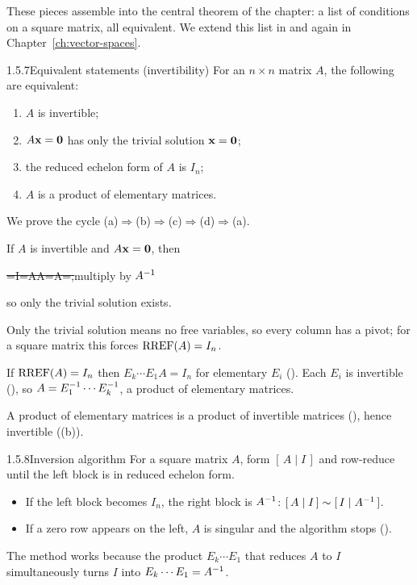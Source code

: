 These pieces assemble into the central theorem of the chapter: a list of conditions on a square matrix, all equivalent. We extend this list in  and again in Chapter~\ref{ch:vector-spaces}.

\begin{thms}{1.5.7}{Equivalent statements (invertibility)}
For an $n\times n$ matrix $A$, the following are equivalent:
\begin{enumerate}[label=\textup{(\alph*)},leftmargin=2.2em,itemsep=1pt]
\item $A$ is invertible;
\item $A\mathbf{x}=\mathbf{0}$ has only the trivial solution $\mathbf{x}=\mathbf{0}$;
\item the reduced echelon form of $A$ is $I_n$;
\item $A$ is a product of elementary matrices.
\end{enumerate}
\end{thms}

\begin{prf}
We prove the cycle (a)$\Rightarrow$(b)$\Rightarrow$(c)$\Rightarrow$(d)$\Rightarrow$(a).

 If $A$ is invertible and $A\mathbf{x}=\mathbf{0}$, then
\begin{steps}
\st{\vx=I\vx=A\inv A\vx=A\inv\vze=\vze,}{multiply by $A^{-1}$}
\end{steps}
so only the trivial solution exists.

 Only the trivial solution means no free variables, so every column has a pivot; for a square matrix this forces $\operatorname{RREF}(A)=I_n$.

 If $\operatorname{RREF}(A)=I_n$ then $E_k\cdots E_1A=I_n$ for elementary $E_i$ (). Each $E_i$ is invertible (), so $A=E_1^{-1}\cdots E_k^{-1}$, a product of elementary matrices.

 A product of elementary matrices is a product of invertible matrices (), hence invertible ((b)).
\end{prf}

\begin{algs}{1.5.8}{Inversion algorithm}
For a square matrix $A$, form $[\,A\mid I\,]$ and row-reduce until the left block is in reduced echelon form.
\begin{itemize}[leftmargin=1.4em,itemsep=1pt]
\item If the left block becomes $I_n$, the right block is $A^{-1}$: \;$[\,A\mid I\,]\sim[\,I\mid A^{-1}\,]$.
\item If a zero row appears on the left, $A$ is singular and the algorithm stops ().
\end{itemize}
The method works because the product $E_k\cdots E_1$ that reduces $A$ to $I$ simultaneously turns $I$ into $E_k\cdots E_1=A^{-1}$.
\end{algs}

